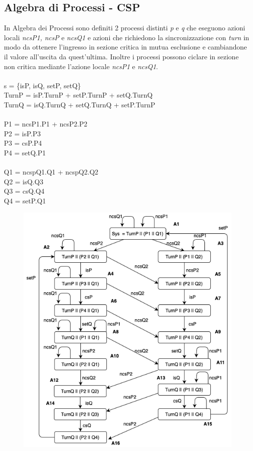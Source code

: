 \documentclass{article}
\begin{document}
\subsection{Algebra di Processi - CSP}
In Algebra dei Processi sono definiti 2 processi distinti \textit{p} e \textit{q} che eseguono azioni locali \textit{ncsP1, ncsP} e \textit{ncsQ1} e azioni che richiedono la sincronizzazione con \textit{turn} in modo da ottenere l'ingresso in sezione critica in mutua esclusione e cambiandone il valore all'uscita da quest'ultima. Inoltre i processi possono ciclare in sezione non critica mediante l'azione locale \textit{ncsP1} e \textit{ncsQ1}.
\\\\s = \{isP, isQ, setP, setQ\}
\\TurnP = isP.TurnP + setP.TurnP + setQ.TurnQ
\\TurnQ = isQ.TurnQ + setQ.TurnQ + setP.TurnP
\\
\\P1 = ncsP1.P1 + ncsP2.P2 
\\P2 = isP.P3
\\P3 = csP.P4
\\P4 = setQ.P1
\\
\\Q1 = ncspQ1.Q1 + ncspQ2.Q2
\\Q2 = isQ.Q3
\\Q3 = csQ.Q4
\\Q4 = setP.Q1
\begin{figure}[h] 
\centering
\includegraphics[scale=0.7]{DG3.2.png}
\end{figure}
\end{document}
